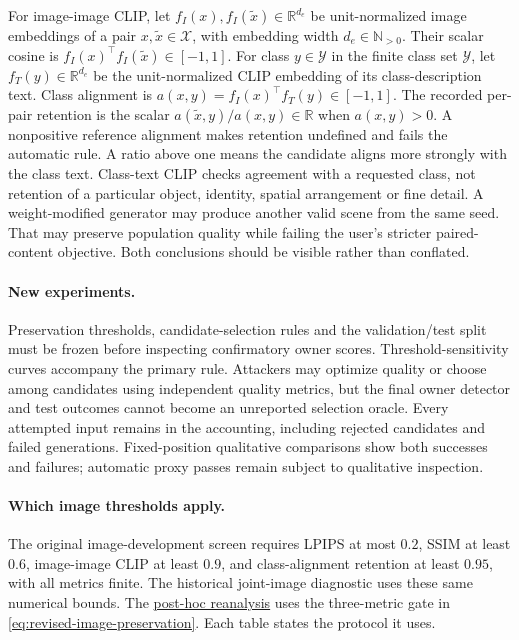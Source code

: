 For image-image CLIP, let $f_I(x),f_I(\widetilde x)\in\mathbb R^{d_e}$ be unit-normalized image embeddings of a pair $x,\widetilde x\in\mathcal X$, with embedding width $d_e\in\mathbb N_{>0}$. Their scalar cosine is $f_I(x)^\top f_I(\widetilde x)\in[-1,1]$. For class $y\in\mathcal Y$ in the finite class set $\mathcal Y$, let $f_T(y)\in\mathbb R^{d_e}$ be the unit-normalized CLIP embedding of its class-description text. Class alignment is $a(x,y)=f_I(x)^\top f_T(y)\in[-1,1]$. The recorded per-pair retention is the scalar $a(\widetilde x,y)/a(x,y)\in\mathbb R$ when $a(x,y)>0$. A nonpositive reference alignment makes retention undefined and fails the automatic rule. A ratio above one means the candidate aligns more strongly with the class text. Class-text CLIP checks agreement with a requested class, not retention of a particular object, identity, spatial arrangement or fine detail. A weight-modified generator may produce another valid scene from the same seed. That may preserve population quality while failing the user's stricter paired-content objective. Both conclusions should be visible rather than conflated.

\paragraph{New experiments.} Preservation thresholds, candidate-selection rules and the validation/test split must be frozen before inspecting confirmatory owner scores. Threshold-sensitivity curves accompany the primary rule. Attackers may optimize quality or choose among candidates using independent quality metrics, but the final owner detector and test outcomes cannot become an unreported selection oracle. Every attempted input remains in the accounting, including rejected candidates and failed generations. Fixed-position qualitative comparisons show both successes and failures; automatic proxy passes remain subject to qualitative inspection.

\paragraph{Which image thresholds apply.}
The original image-development screen requires LPIPS at most $0.2$, SSIM at least $0.6$, image-image CLIP at least $0.9$, and class-alignment retention at least $0.95$, with all metrics finite. The historical joint-image diagnostic uses these same numerical bounds. The \hyperref[sec:quality_recalibration]{post-hoc reanalysis} uses the three-metric gate in \eqref{eq:revised-image-preservation}. Each table states the protocol it uses.

